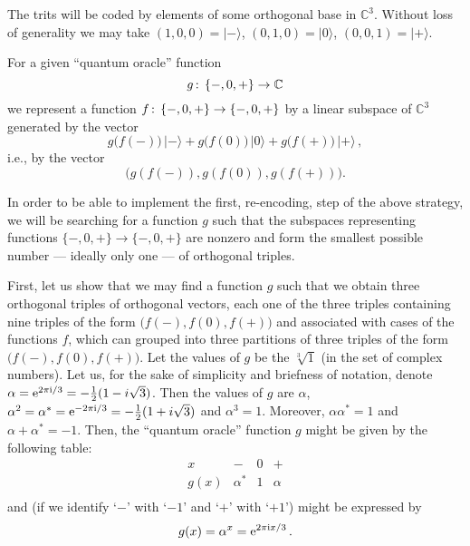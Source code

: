 \documentclass[fleqn,twoside]{article}
\begin{document}
 The trits will be coded by
elements of some  orthogonal base in ${\mathbb{ C}}^3$. Without loss of
generality we may take
$(1,0,0) = |-\rangle$, $(0,1,0) = |0\rangle$,
$(0,0,1) = |+\rangle $.

For a given ``quantum oracle'' function
$$g \,{:}\linebreak[0]\,\;
\{-,0,+\} \to {\mathbb{ C}}$$
we represent a function
$f
\,{:}\linebreak[0]\,\; \{-,0,+\} \to \{-,0,+\}$ by a linear subspace of
${\mathbb{ C}}^3$ generated by the vector
  $$g\bigl(f(-)\bigr)\,|-\rangle +
    g\bigl(f(0)\bigr)\,|0\rangle +
    g\bigl(f(+)\bigr)\,|+\rangle\,,$$
i.e., by the vector
$$\bigl(g(f(-)), g(f(0)), g(f(+))\bigr).$$


In order to be able to implement the first, re-encoding, step of the above strategy,
we will be searching for a function $g$ such that the subspaces representing functions
$\{-,0,+\} \to \{-,0,+\}$ are nonzero and form the smallest possible number --- ideally only one ---
of orthogonal triples.

First, let us show that we may find a function $g$ such that we obtain three orthogonal triples of orthogonal vectors,
each one of the three triples containing nine triples of the form  $\bigl( f(-), f(0), f(+) \bigr)$ and associated with cases of the functions $f$,
which can grouped into three partitions of three triples of the form $\bigl( f(-), f(0), f(+) \bigr)$.
Let the values of $g$ be the $\sqrt[3]{1}$ (in the set
of complex numbers). Let us, for the sake of simplicity and briefness of notation,
denote $\alpha ={\rm e}^{2\pi {\rm i}/3}=-{1\over 2}(1-i\sqrt{3})$. Then the values of $g$ are
$\alpha$, $\alpha^2 = \alpha^\ast  = {\rm e}^{-2\pi {\rm i}/3}=-{1\over 2}(1+i\sqrt{3})$ and $\alpha^3=1$. Moreover, $\alpha
\alpha^\ast  = 1$ and $\alpha + \alpha^\ast = -1$. Then, the ``quantum
oracle'' function $g$ might be given by the following table:
  $$
  \begin {array}{c||c|c|c}

  x    & -       & 0 & +\\\hline
  g(x) & \alpha^\ast  & 1 & \alpha    \\

  \end {array}
  $$
and (if we identify `$-$' with `$-1$' and `$+$' with `$+1$') might be
expressed by
  $$g(x) = \alpha^x = {\rm e}^{2\pi{\rm i}x/3}\,.$$
\end{document}
